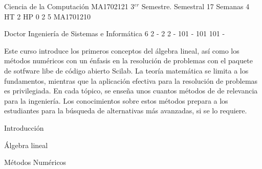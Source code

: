 \documentclass[a4paper,8pt]{article}
\begin{document}
\setNombreProfesor{}
\setGradoProfesorAbreviado{}
\sylabusHeader

\academicaTable
{Ciencia de la Computación} %
{MA1702121} %
{3$^{er}$ Semestre.} %
{Semestral} %
{17 Semanas} %
{4 HT} %
{2 HP} %
{0} %
{}  %
{2} %
{5} %
{MA1701210} %

\administrativaTable
{Doctor} %
{Ingeniería de Sistemas e Informática} %
{6} %
{2} %
{-} %
{2} %
{2} %
{-} %
{101} %
{-} %
{101} %
{101} %
{-} %


\begin{fundamentacion}
Este curso introduce los primeros conceptos del álgebra lineal, así como los métodos numéricos con un énfasis en la resolución de problemas
con el paquete de sotfware libe de código abierto Scilab.
La teoría matemática se limita a los fundamentos, mientras que la aplicación efectiva para la resolución de problemas es privilegiada. 
En cada tópico, se enseña unos cuantos métodos de de relevancia para la ingeniería. 
Los conocimientos sobre estos métodos prepara a los estudiantes para la búsqueda de alternativas más avanzadas, si se lo requiere.

\end{fundamentacion}

\begin{sumilla}
\item Introducción
\item Álgebra lineal
\item Métodos Numéricos

\end{sumilla}

\begin{competenciasAsignatura}
\item {}
\item {}
\item {}

\end{competenciasAsignatura}
\end{document}
